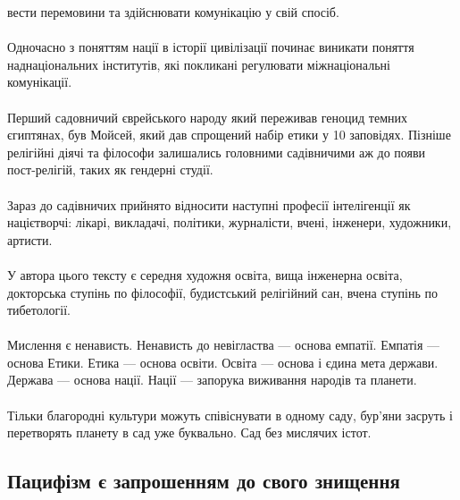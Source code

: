 вести перемовини та здійснювати комунікацію у свій спосіб.
\\
\\
Одночасно з поняттям нації в історії цивілізації починає виникати поняття наднаціональних інститутів,
які покликані регулювати міжнаціональні комунікації.
\\
\\
Перший садовничий єврейського народу який переживав геноцид темних єгиптянах, був Мойсей,
який дав спрощений набір етики у 10 заповідях. Пізніше релігійні діячі та філософи
залишались головними садівничими аж до появи пост-релігій, таких як гендерні студії.
\\
\\
Зараз до садівничих прийнято відносити наступні професії інтелігенції як націєтворчі:
лікарі, викладачі, політики, журналісти, вчені, інженери, художники, артисти.
\\
\\
У автора цього тексту є середня художня освіта, вища інженерна освіта,
докторська ступінь по філософії, будистський релігійний сан, вчена ступінь по тибетології.
\\
\\
Мислення є ненависть. Ненависть до невігластва --- основа емпатії.
Емпатія --- основа Етики.
Етика --- основа освіти.
Освіта --- основа і єдина мета держави.
Держава --- основа нації.
Нації --- запорука виживання народів та планети.
\\
\\
Тільки благородні культури можуть співіснувати в одному саду, бур'яни засруть і перетворять
планету в сад уже буквально. Сад без мислячих істот.

\newpage
\subsection{Пацифізм є запрошенням до свого знищення}

